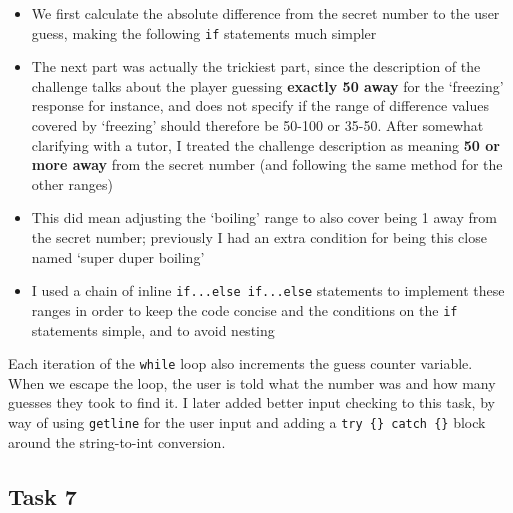 \documentclass[
]{article}
\providecommand{\tightlist}{%
  \setlength{\itemsep}{0pt}\setlength{\parskip}{0pt}}
\begin{document}
\begin{itemize}
\tightlist
\item
  We first calculate the absolute difference from the secret number to
  the user guess, making the following \texttt{if} statements much
  simpler
\item
  The next part was actually the trickiest part, since the description
  of the challenge talks about the player guessing \textbf{exactly 50
  away} for the `freezing' response for instance, and does not specify
  if the range of difference values covered by `freezing' should
  therefore be 50-100 or 35-50. After somewhat clarifying with a tutor,
  I treated the challenge description as meaning \textbf{50 or more
  away} from the secret number (and following the same method for the
  other ranges)
\item
  This did mean adjusting the `boiling' range to also cover being 1 away
  from the secret number; previously I had an extra condition for being
  this close named `super duper boiling'
\item
  I used a chain of inline \texttt{if...else\ if...else} statements to
  implement these ranges in order to keep the code concise and the
  conditions on the \texttt{if} statements simple, and to avoid nesting
\end{itemize}

Each iteration of the \texttt{while} loop also increments the guess
counter variable. When we escape the loop, the user is told what the
number was and how many guesses they took to find it. I later added
better input checking to this task, by way of using \texttt{getline} for
the user input and adding a \texttt{try\ \{\}\ catch\ \{\}} block around
the string-to-int conversion.

\subsection{Task 7}\label{task-7}
\end{document}
